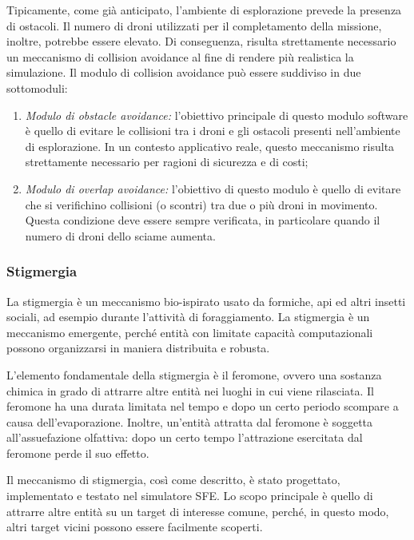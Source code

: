 Tipicamente, come già anticipato, l’ambiente di esplorazione prevede la presenza di ostacoli. 
Il numero di droni utilizzati per il completamento della missione, inoltre, potrebbe essere elevato.
Di conseguenza, risulta strettamente necessario un meccanismo di collision avoidance al fine di rendere più realistica la simulazione. 
Il modulo di collision avoidance può essere suddiviso in due sottomoduli:

\begin{enumerate}
    \item \textit{Modulo di obstacle avoidance:} l’obiettivo principale di questo modulo software è quello di evitare le collisioni tra i droni e gli ostacoli presenti nell’ambiente di esplorazione. 
    In un contesto applicativo reale, questo meccanismo risulta strettamente necessario per ragioni di sicurezza e di costi;
    \item \textit{Modulo di overlap avoidance:} l’obiettivo di questo modulo è quello di evitare che si verifichino collisioni (o scontri) tra due o più droni in movimento. 
    Questa condizione deve essere sempre verificata, in particolare quando il numero di droni dello sciame aumenta.
\end{enumerate}

\subsubsection{Stigmergia}

La stigmergia è un meccanismo bio-ispirato usato da formiche, api ed altri insetti sociali, ad esempio durante l’attività di foraggiamento. 
La stigmergia è un meccanismo emergente, perché entità con limitate capacità computazionali possono organizzarsi in maniera distribuita e robusta.

L’elemento fondamentale della stigmergia è il feromone, ovvero una sostanza chimica in grado di attrarre altre entità nei luoghi in cui viene rilasciata. 
Il feromone ha una durata limitata nel tempo e dopo un certo periodo scompare a causa dell’evaporazione. 
Inoltre, un’entità attratta dal feromone è soggetta all’assuefazione olfattiva: dopo un certo tempo l’attrazione esercitata dal feromone perde il suo effetto.

Il meccanismo di stigmergia, così come descritto, è stato progettato, implementato e testato nel simulatore SFE. 
Lo scopo principale è quello di attrarre altre entità su un target di interesse comune, perché, in questo modo, altri target vicini possono essere facilmente scoperti.

